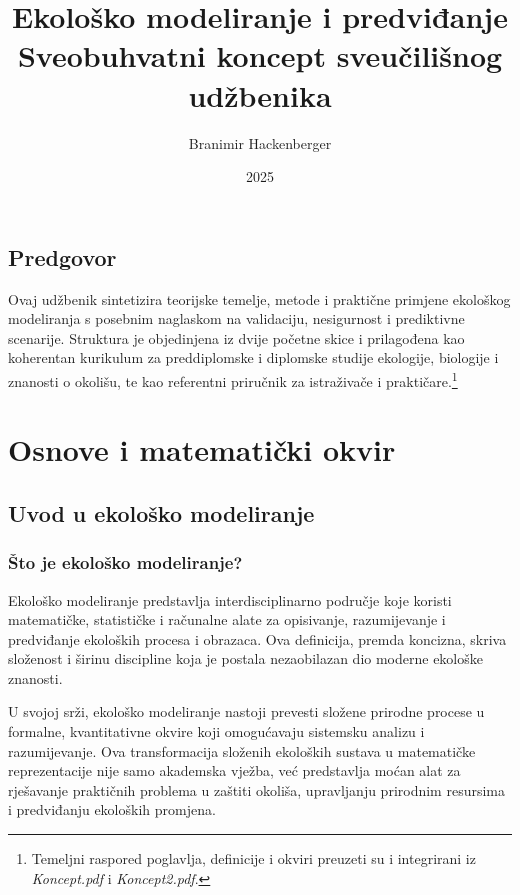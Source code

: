 \documentclass[11pt,oneside]{book}
\title{Ekološko modeliranje i predviđanje\\[4pt]\large Sveobuhvatni koncept sveučilišnog udžbenika}
\author{Branimir Hackenberger}
\date{2025}
\begin{document}
	\frontmatter
	\maketitle
	\tableofcontents
	
	\chapter*{Predgovor}
	Ovaj udžbenik sintetizira teorijske temelje, metode i praktične primjene ekološkog
	modeliranja s posebnim naglaskom na validaciju, nesigurnost i prediktivne scenarije.
	Struktura je objedinjena iz dvije početne skice i prilagođena kao koherentan kurikulum
	za preddiplomske i diplomske studije ekologije, biologije i znanosti o okolišu, te kao
	referentni priručnik za istraživače i praktičare.\footnote{Temeljni raspored poglavlja,
		definicije i okviri preuzeti su i integrirani iz \textit{Koncept.pdf} i \textit{Koncept2.pdf}.}
	
	\mainmatter
	
	\part{Osnove i matematički okvir}
	
	\chapter{Uvod u ekološko modeliranje}
\section{Što je ekološko modeliranje?}

Ekološko modeliranje predstavlja interdisciplinarno područje koje koristi matematičke, statističke i računalne alate za opisivanje, razumijevanje i predviđanje ekoloških procesa i obrazaca. Ova definicija, premda koncizna, skriva složenost i širinu discipline koja je postala nezaobilazan dio moderne ekološke znanosti.

U svojoj srži, ekološko modeliranje nastoji prevesti složene prirodne procese u formalne, kvantitativne okvire koji omogućavaju sistemsku analizu i razumijevanje. Ova transformacija složenih ekoloških sustava u matematičke reprezentacije nije samo akademska vježba, već predstavlja moćan alat za rješavanje praktičnih problema u zaštiti okoliša, upravljanju prirodnim resursima i predviđanju ekoloških promjena.
\end{document}
